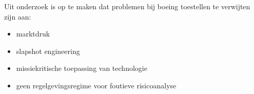 \documentclass{article}
\begin{document}
	Uit onderzoek is op te maken dat problemen bij boeing toestellen te verwijten zijn aan:
	\begin{itemize}
		\item marktdruk %
		\item slapshot engineering
		\item missiekritische toepassing van technologie%
		\item geen regelgevingsregime voor foutieve risicoanalyse %
	\end{itemize}
	
\end{document}
